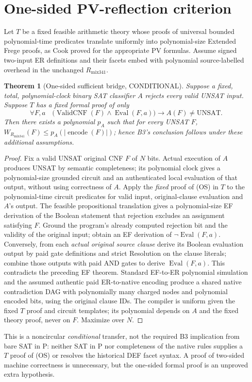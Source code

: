 \documentclass[11pt]{article}
\newtheorem{theorem}{Theorem}
\begin{document}
\section{One-sided PV-reflection criterion}
Let $T$ be a fixed feasible arithmetic theory whose proofs of universal bounded polynomial-time predicates translate uniformly into polynomial-size Extended Frege proofs, as Cook proved for the appropriate PV formulas. Assume signed two-input ER definitions and their facets embed with polynomial source-labelled overhead in the unchanged $R_{\mathrm{mix341}}$.
\begin{theorem}[One-sided sufficient bridge, CONDITIONAL]
Suppose a fixed, total, polynomial-clock binary SAT classifier $A$ rejects every valid UNSAT input. Suppose $T$ has a fixed \emph{formal proof} of only
\[
\forall F,a\quad
\bigl(\operatorname{ValidCNF}(F)\wedge \operatorname{Eval}(F,a)\bigr)
\longrightarrow A(F)\ne\mathrm{UNSAT}. \tag{OS}
\]
Then there exists a polynomial $p_A$ such that for every UNSAT $F$,
$W_{R_{\mathrm{mix341}}}(F)\le p_A(|\operatorname{encode}(F)|)$; hence B3's conclusion follows under these additional assumptions.
\end{theorem}
\begin{proof}
Fix a valid UNSAT original CNF $F$ of $N$ bits. Actual execution of $A$ produces UNSAT by semantic completeness; its polynomial clock gives a polynomial-size grounded circuit and an authenticated local evaluation of that output, without using correctness of $A$. Apply the \emph{fixed} proof of (OS) in $T$ to the polynomial-time circuit predicates for valid input, original-clause evaluation and $A$'s output. The feasible propositional translation gives a polynomial-size EF derivation of the Boolean statement that rejection excludes an assignment satisfying $F$. Ground the program's already computed rejection bit and the validity of the original input; obtain an EF derivation of $\neg\operatorname{Eval}(F,a)$. Conversely, from each \emph{actual original source clause} derive its Boolean evaluation output by paid gate definitions and strict Resolution on the clause literals; combine those outputs with paid AND gates to derive $\operatorname{Eval}(F,a)$. This contradicts the preceding EF theorem. Standard EF-to-ER polynomial simulation and the assumed authentic paid ER-to-native encoding produce a shared native contradiction DAG with polynomially many charged nodes and polynomial encoded bits, using the original clause IDs. The compiler is uniform given the fixed $T$ proof and circuit templates; its polynomial depends on $A$ and the fixed theory proof, never on $F$. Maximize over $N$.
\end{proof}
This is a noncircular \emph{conditional} transfer, not the required B3 implication from bare SAT in P: neither SAT in P nor completeness of the native rules supplies a $T$ proof of (OS) or resolves the historical DEF facet syntax. A proof of two-sided machine correctness is unnecessary, but the one-sided formal proof is an unproved extra hypothesis.
\end{document}
